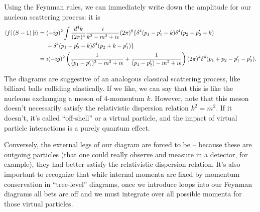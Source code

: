 Using the Feynman rules, we can immediately write down the amplitude for our nucleon scattering process: it is
\begin{align*}
\left< f \right|(S-1)\left| i \right>={}&(-ig)^2\int \frac{d^4k}{(2\pi)^4} \frac{i}{k^2-m^2+i\epsilon} (2\pi)^8 \{\delta^4(p_1-p_1' -k)\delta^4(p_2-p_2' +k)\\
&+\delta^4(p_1-p_2'-k)\delta^4(p_2+k-p_1')\}\\
={}& i(-ig)^2 \left(\frac{1}{(p_1-p_1')^2-m^2+i\epsilon}+\frac{1}{(p_1-p_2')-m^2+i\epsilon}\right) (2\pi)^4 \delta^4(p_1+p_2-p_1' -p_2').
\end{align*}

The diagrams are suggestive of an analogous classical scattering process, like billiard balls colliding elastically. If we like, we can say that this is like the nucleons exchanging a meson of 4-momentum $k$. However, note that this meson doesn't necessarily satisfy the relativistic dispersion relation $k^2=m^2$. If it doesn't, it's called ``off-shell'' or a virtual particle, and the impact of virtual particle interactions is a purely quantum effect. 

Conversely, the external legs of our diagram are forced to be -- because these are outgoing particles (that one could really observe and measure in a detector, for example), they had better satisfy the relativistic dispersion relation. It's also important to recognize that while internal momenta are fixed by momentum conservation in ``tree-level'' diagrams, once we introduce loops into our Feynman diagrams all bets are off and we must integrate over all possible momenta for those virtual particles.